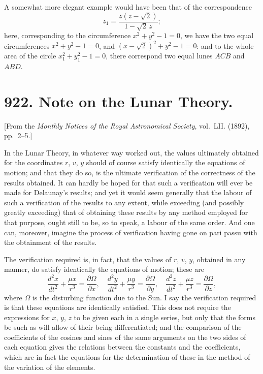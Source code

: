 \documentclass[11pt,a4paper]{book}
\begin{document}
A somewhat more elegant example would have been that of the correspondence
\[
z_1 = \frac{z(z-\sqrt{2})}{1-\sqrt{2}\,z};
\]
here, corresponding to the circumference $x^2 + y^2 - 1 = 0$, we have the two equal
circumferences $x^2 + y^2 - 1 = 0$, and $(x - \sqrt{2})^2 + y^2 - 1 = 0$: and to the whole area of the
circle $x_1^2 + y_1^2 - 1 = 0$, there correspond two equal lunes $ACB$ and $ABD$.



\newpage
\section*{922. Note on the Lunar Theory.}

[From the \textit{Monthly Notices of the Royal Astronomical Society}, vol.~LII. (1892), pp.~2--5.]

\bigskip

In the Lunar Theory, in whatever way worked out, the values ultimately obtained
for the coordinates $r$, $v$, $y$ should of course satisfy identically the equations of
motion; and that they do so, is the ultimate verification of the correctness of the
results obtained. It can hardly be hoped for that such a verification will ever be
made for Delaunay's results; and yet it would seem generally that the labour of
such a verification of the results to any extent, while exceeding (and possibly greatly
exceeding) that of obtaining these results by any method employed for that purpose,
ought still to be, so to speak, a labour of the same order. And one can, moreover,
imagine the process of verification having gone on pari passu with the obtainment of
the results.

The verification required is, in fact, that the values of $r$, $v$, $y$, obtained in any
manner, do satisfy identically the equations of motion; these are
\[
\frac{d^2x}{dt^2} + \frac{\mu x}{r^3} = \frac{\partial\Omega}{\partial x}, \quad
\frac{d^2y}{dt^2} + \frac{\mu y}{r^3} = \frac{\partial\Omega}{\partial y}, \quad
\frac{d^2z}{dt^2} + \frac{\mu z}{r^3} = \frac{\partial\Omega}{\partial z},
\]
where $\Omega$ is the disturbing function due to the Sun. I say the verification required is
that these equations are identically satisfied. This does not require the expressions
for $x$, $y$, $z$ to be given each in a single series, but only that the forms be such as
will allow of their being differentiated; and the comparison of the coefficients of the
cosines and sines of the same arguments on the two sides of each equation gives
the relations between the constants and the coefficients, which are in fact the
equations for the determination of these in the method of the variation of the
elements.
\end{document}
